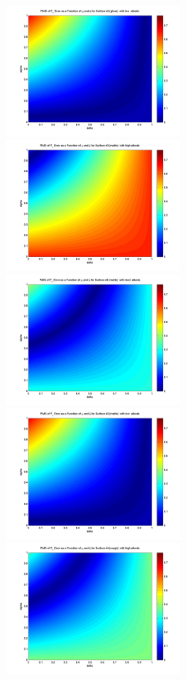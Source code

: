\begin{description}
\begin{figure}[!ht]
\begin{minipage}[t]{200mm}
    \includegraphics[width=65mm]{figs/sda/F_x_error_albedo__low_surf__gloss.jpg}
    \includegraphics[width=65mm]{figs/sda/F_x_error_albedo_high_surf__matte.jpg}
    \includegraphics[width=65mm]{figs/sda/F_x_error_albedo__med_surf__matte.jpg}
    \includegraphics[width=65mm]{figs/sda/F_x_error_albedo__low_surf__matte.jpg}
    \includegraphics[width=65mm]{figs/sda/F_x_error_albedo_high_surf__rough.jpg}

\end{minipage}
\end{figure}
\end{description}

